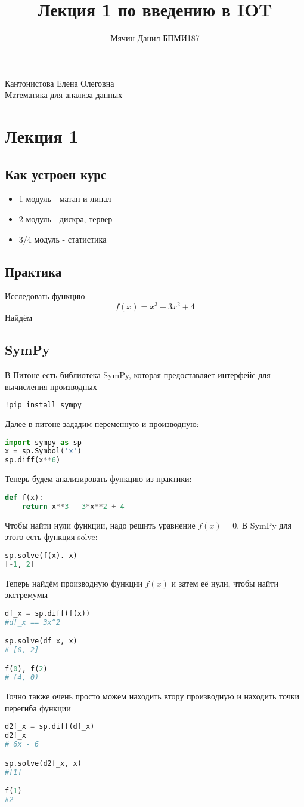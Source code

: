 \documentclass{article}
\title{Лекция 1 по введению в IOT}
\author{Мячин Данил БПМИ187}
\date
\theoremstyle{problemstyle}
\theoremstyle{ans}
\begin{document}
\begin{center}
Кантонистова Елена Олеговна\\
Математика для анализа данных
\end{center}
\tableofcontents
\newpage
\section{Лекция 1}
\subsection{Как устроен курс}
\begin{itemize}
    \item 1 модуль - матан и линал
    \item 2 модуль - дискра, тервер
    \item 3/4 модуль - статистика
\end{itemize}
\subsection{Практика}
Исследовать функцию 
$$f(x) = x^3 - 3x^2 + 4$$
Найдём 

\subsection{SymPy}
В Питоне есть библиотека SymPy, которая предоставляет интерфейс для вычисления производных
\begin{lstlisting}[language=bash]
!pip install sympy
\end{lstlisting}

Далее в питоне зададим переменную и производную:
\begin{lstlisting}[language=python]
import sympy as sp
x = sp.Symbol('x')
sp.diff(x**6)
\end{lstlisting}
Теперь будем анализировать функцию из практики:
\begin{lstlisting}[language=python]
def f(x):
    return x**3 - 3*x**2 + 4
\end{lstlisting}
Чтобы найти нули функции, надо решить уравнение $f(x) = 0$. В SymPy для этого есть функция solve:
\begin{lstlisting}[language=python]
sp.solve(f(x). x)
[-1, 2]
\end{lstlisting}
Теперь найдём производную функции $f(x)$ и затем её нули, чтобы найти экстремумы
\begin{lstlisting}[language=python]
df_x = sp.diff(f(x))
#df_x == 3x^2

sp.solve(df_x, x)
# [0, 2]

f(0), f(2)
# (4, 0)
\end{lstlisting}
Точно также очень просто можем находить втору производную и находить точки перегиба функции
\begin{lstlisting}[language=python]
d2f_x = sp.diff(df_x)
d2f_x
# 6x - 6

sp.solve(d2f_x, x)
#[1]

f(1)
#2
\end{lstlisting}
\end{document}
